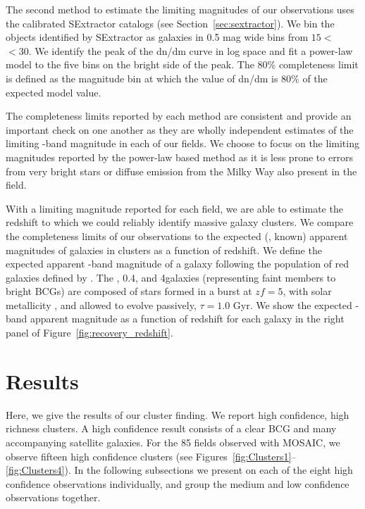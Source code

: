 \documentclass[apj, revtex4-1]{emulateapj}
\begin{document}
The second method to estimate the limiting magnitudes of our observations uses the calibrated SExtractor catalogs (see Section~\ref{sec:sextractor}). We bin the objects identified by SExtractor as galaxies in 0.5 mag wide bins from $15<$ \sdssi\ $<30$. We identify the peak of the dn/dm curve in log space and fit a power-law model to the five bins on the bright side of the peak. The 80\% completeness limit is defined as the magnitude bin at which the value of dn/dm is 80\% of the expected model value.

The completeness limits reported by each method are consistent and provide an important check on one another as they are wholly independent estimates of the limiting \sdssi-band magnitude in each of our fields. We choose to focus on the limiting magnitudes reported by the power-law based method as it is less prone to errors from very bright stars or diffuse emission from the Milky Way also present in the field.

With a limiting magnitude reported for each field, we are able to estimate the redshift to which we could reliably identify massive galaxy clusters. We compare the completeness limits of our observations to the expected (\ie, known) apparent magnitudes of galaxies in clusters as a function of redshift. We define the expected apparent \sdssi-band magnitude of a galaxy following the population of red galaxies defined by \cite{Blanton2003}. The \lstar, 0.4\lstar, and 4\lstar galaxies (representing faint members to bright BCGs) are composed of stars formed in a burst at $zf = 5$, with solar metallicity \citep{Bruzual2003}, and allowed to evolve passively, $\tau = 1.0$ Gyr. We show the expected \sdssi-band apparent magnitude as a function of redshift for each galaxy in the right panel of Figure~\ref{fig:recovery_redshift}.

\section{Results}\label{sec:results}
Here, we give the results of our cluster finding. We report high confidence, high richness clusters. A high confidence result consists of a clear BCG and many accompanying satellite galaxies. For the 85 fields observed with MOSAIC, we observe fifteen high confidence clusters (see Figures~\ref{fig:Clusters1}--\ref{fig:Clusters4}). In the following subsections we present on each of the eight high confidence observations individually, and group the medium and low confidence observations together.
\end{document}
